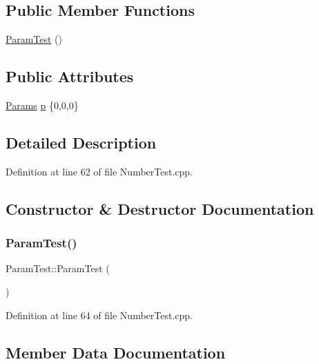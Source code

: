 \subsection*{Public Member Functions}
\begin{DoxyCompactItemize}
\item 
\hyperlink{struct_param_test_afd4f321e586d9c5e11f17f2c768d4067}{Param\+Test} ()
\end{DoxyCompactItemize}
\subsection*{Public Attributes}
\begin{DoxyCompactItemize}
\item 
\hyperlink{struct_params}{Params} \hyperlink{struct_param_test_ab4d405550f168d7a7e59abb75c315e50}{p} \{0,0,0\}
\end{DoxyCompactItemize}


\subsection{Detailed Description}


Definition at line 62 of file Number\+Test.\+cpp.



\subsection{Constructor \& Destructor Documentation}
\mbox{\label{struct_param_test_afd4f321e586d9c5e11f17f2c768d4067}} 
\subsubsection{\texorpdfstring{Param\+Test()}{ParamTest()}}
{\footnotesize\ttfamily Param\+Test\+::\+Param\+Test (\begin{DoxyParamCaption}{ }\end{DoxyParamCaption})\hspace{0.3cm}{\ttfamily [inline]}}



Definition at line 64 of file Number\+Test.\+cpp.



\subsection{Member Data Documentation}
\mbox{\label{struct_param_test_ab4d405550f168d7a7e59abb75c315e50}} 
